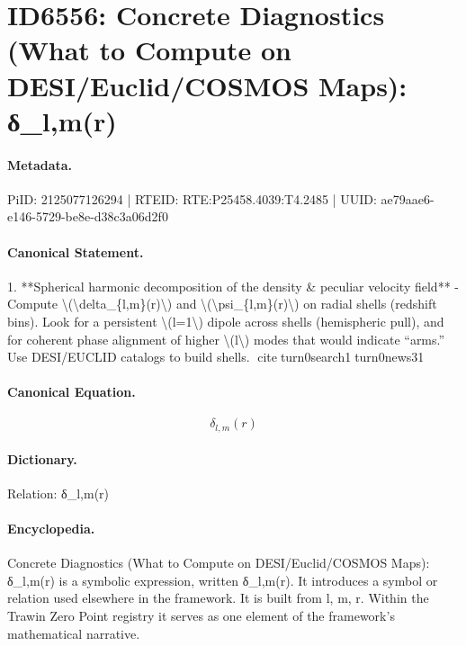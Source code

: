 \section*{ID6556: Concrete Diagnostics (What to Compute on DESI/Euclid/COSMOS Maps): δ\_l,m(r)}
\paragraph{Metadata.}
PiID: 2125077126294 | RTEID: RTE:P25458.4039:T4.2485 | UUID: ae79aae6-e146-5729-be8e-d38c3a06d2f0

\paragraph{Canonical Statement.}
1. **Spherical harmonic decomposition of the density \& peculiar velocity field** - Compute \textbackslash{}(\textbackslash{}delta\_\{l,m\}(r)\textbackslash{}) and \textbackslash{}(\textbackslash{}psi\_\{l,m\}(r)\textbackslash{}) on radial shells (redshift bins). Look for a persistent \textbackslash{}(l=1\textbackslash{}) dipole across shells (hemispheric pull), and for coherent phase alignment of higher \textbackslash{}(l\textbackslash{}) modes that would indicate “arms.” Use DESI/EUCLID catalogs to build shells. citeturn0search1turn0news31

\paragraph{Canonical Equation.}
\[
\delta_{l,m}(r)
\]

\paragraph{Dictionary.}
Relation: δ\_l,m(r)

\paragraph{Encyclopedia.}
Concrete Diagnostics (What to Compute on DESI/Euclid/COSMOS Maps): δ\_l,m(r) is a symbolic expression, written δ\_l,m(r). It introduces a symbol or relation used elsewhere in the framework. It is built from l, m, r. Within the Trawin Zero Point registry it serves as one element of the framework's mathematical narrative.
